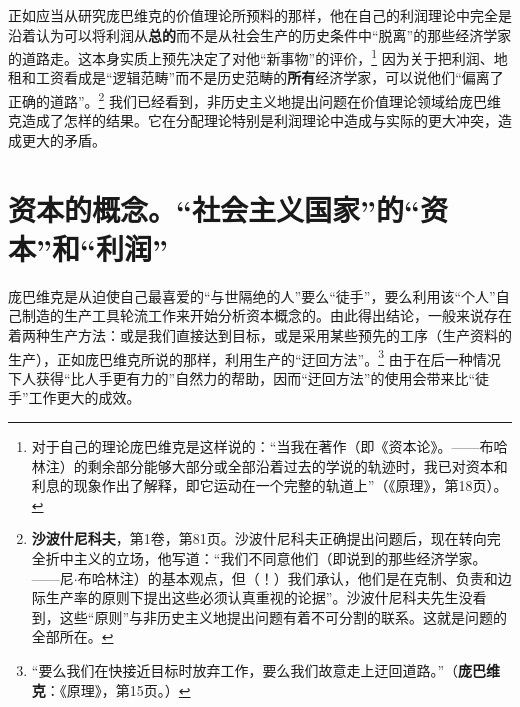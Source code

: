 \documentclass[fontset=fandol, a4paper, 12pt, openright]{ctexbook}
\begin{document}
正如应当从研究庞巴维克的价值理论所预料的那样，他在自己的利润理论中完全是沿着认为可以将利润从\textbf{总的}而不是从社会生产的历史条件中“脱离”的那些经济学家的道路走。这本身实质上预先决定了对他“新事物”的评价，\footnote{对于自己的理论庞巴维克是这样说的：“当我在著作（即《资本论》。——布哈林注）的剩余部分能够大部分或全部沿着过去的学说的轨迹时，我已对资本和利息的现象作出了解释，即它运动在一个完整的轨道上”（《原理》，第18页）。} 因为关于把利润、地租和工资看成是“逻辑范畴”而不是历史范畴的\textbf{所有}经济学家，可以说他们“偏离了正确的道路”。\footnote{\textbf{沙波什尼科夫}，第1卷，第81页。沙波什尼科夫正确提出问题后，现在转向完全折中主义的立场，他写道：“我们不同意他们（即说到的那些经济学家。——尼$\cdot$布哈林注）的基本观点，但（！）我们承认，他们是在克制、负责和边际生产率的原则下提出这些必须认真重视的论据”。沙波什尼科夫先生没看到，这些“原则”与非历史主义地提出问题有着不可分割的联系。这就是问题的全部所在。} 我们已经看到，非历史主义地提出问题在价值理论领域给庞巴维克造成了怎样的结果。它在分配理论特别是利润理论中造成与实际的更大冲突，造成更大的矛盾。

\section{资本的概念。“社会主义国家”的“资本”和“利润”}

庞巴维克是从迫使自己最喜爱的“与世隔绝的人”要么“徒手”，要么利用该“个人”自己制造的生产工具轮流工作来开始分析资本概念的。由此得出结论，一般来说存在着两种生产方法：或是我们直接达到目标，或是采用某些预先的工序（生产资料的生产），正如庞巴维克所说的那样，利用生产的“迂回方法”。\footnote{“要么我们在快接近目标时放弃工作，要么我们故意走上迂回道路。”（\textbf{庞巴维克}：《原理》，第15页。）} 由于在后一种情况下人获得“比人手更有力的”自然力的帮助，因而“迂回方法”的使用会带来比“徒手”工作更大的成效。
\end{document}
